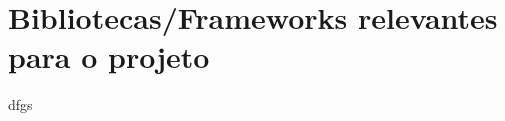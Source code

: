 \begin{comment}
"Python é uma linguagem de programação de alto nível e propósito geral. A sua filosofia
de design enfatiza a legibilidade do código com o uso de indentação significativa.

Python é dinamicamente tipada e possui coleta de lixo automática. 
Suporta múltiplos paradigmas de programação, incluindo estruturada (particularmente 
procedural), orientada a objetos e programação funcional. É frequentemente descrita como 
uma linguagem "com tudo incluído", devido à sua biblioteca padrão abrangente." \cite{python}



As principais cracteriasaticas desta linguagem são:

\begin{itemize}
\item \textbf{Sintaxe Clara e Concisa}: Python é conhecido pela sua sintaxe limpa
e fácil de ler, o que a torna ideal para iniciantes e facilita a manutenção de código;
\item \textbf{Tipagem Dinâmica}: Em Python, não é necessário declarar explicitamente o
tipo de uma variável. O tipo é inferido dinamicamente durante a execução do programa;
\item \textbf{Multiparadigma}: Python suporta diversos paradigmas de programação,
incluindo programação orientada a objetos, programação imperativa e programação funcional;
\item \textbf{Biblioteca Padrão Abrangente}: Python vem com uma vasta biblioteca 
padrão que oferece suporte para uma ampla gama de tarefas, desde manipulação de arquivos 
até desenvolvimento web;
\item \textbf{Comunidade Ativa}:Python possui uma comunidade enorme e ativa de 
desenvolvedores em todo o mundo. Isto resulta numa grande quantidade
de recursos disponíveis, como bibliotecas de terceiros, frameworks e ferramentas 
de desenvolvimento.
\end{itemize}


"Python é suficientemente rápido para o nosso site e permite-nos produzir funcionalidades 
mantíveis em tempos recorde, com um mínimo de programadores." \cite{pyyt}

\end{comment}

\section{Bibliotecas/Frameworks relevantes para o projeto}

dfgs

